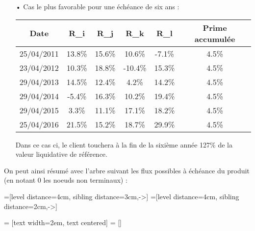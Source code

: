 \documentclass[french,12pt,a4paper]{article}
\begin{document}
\begin{itemize}
\item[•]
Cas le plus favorable pour une échéance de six ans :
\begin{center}
\begin{tabular}{|c|c|c|c|c|c|}
  \hline
  Date & R_{i} & R_{j} & R_{k} & R_{l} & Prime accumulée \\
  \hline
  25/04/2011 & 13.8\% & 15.6\% & 10.6\% & -7.1\% & 4.5\% \\
  23/04/2012 & 10.3\% & 18.8\% & -10.4\% & 15.3\% & 4.5\% \\
  29/04/2013 & 14.5\% & 12.4\% & 4.2\% & 14.2\% & 4.5\%\\
  29/04/2014 & -5.4\% & 16.3\% & 10.2\% & 19.4\% & 4.5\%\\
  29/04/2015 & 3.3\% & 11.1\% & 17.1\% & 18.2\% & 4.5\%\\
  25/04/2016 & 21.5\% & 15.2\% & 18.7\% & 29.9\% & 4.5\%\\
  \hline
\end{tabular}
\end{center}

Dans ce cas ci, le client touchera à la fin de la sixième année 127\% de la valeur liquidative de référence.
\end{itemize}

On peut ainsi résumé avec l'arbre suivant les flux possibles à échéance du produit (en notant 0 les noeuds non terminaux)  :

=[level distance=4cm, sibling distance=3cm,->]
=[level distance=4cm, sibling distance=2cm,->]

 = [text width=2em, text centered]
 = []
\end{document}
